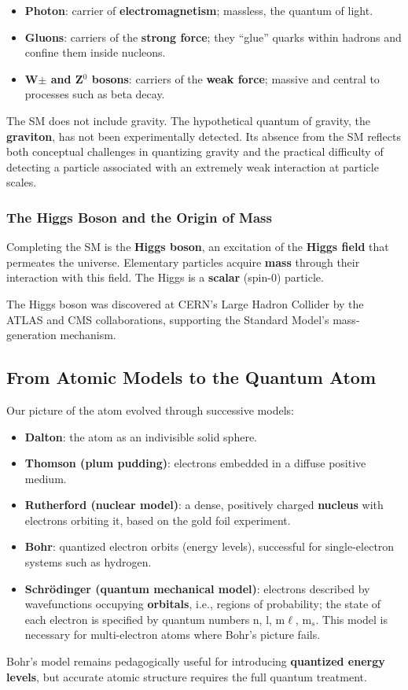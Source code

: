 \documentclass[11pt,a4paper]{article}
\let\originalsubsection\subsection
\renewcommand{\subsection}{\Needspace{8\baselineskip}\originalsubsection}
\begin{document}
\begin{itemize}
\item \textbf{Photon}: carrier of \textbf{electromagnetism}; massless, the quantum of light.
\item \textbf{Gluons}: carriers of the \textbf{strong force}; they ``glue'' quarks within hadrons and confine them inside nucleons.
\item \textbf{W\ensuremath{\pm} and Z\ensuremath{{}^{0}} bosons}: carriers of the \textbf{weak force}; massive and central to processes such as beta decay.
\end{itemize}
The SM does not include gravity. The hypothetical quantum of gravity, the \textbf{graviton}, has not been experimentally detected. Its absence from the SM reflects both conceptual challenges in quantizing gravity and the practical difficulty of detecting a particle associated with an extremely weak interaction at particle scales.

\subsubsection{The Higgs Boson and the Origin of Mass}
Completing the SM is the \textbf{Higgs boson}, an excitation of the \textbf{Higgs field} that permeates the universe. Elementary particles acquire \textbf{mass} through their interaction with this field. The Higgs is a \textbf{scalar} (spin-0) particle.

The Higgs boson was discovered at CERN's Large Hadron Collider by the ATLAS and CMS collaborations, supporting the Standard Model's mass-generation mechanism.

\subsection{From Atomic Models to the Quantum Atom}
Our picture of the atom evolved through successive models:

\begin{itemize}
\item \textbf{Dalton}: the atom as an indivisible solid sphere.
\item \textbf{Thomson (plum pudding)}: electrons embedded in a diffuse positive medium.
\item \textbf{Rutherford (nuclear model)}: a dense, positively charged \textbf{nucleus} with electrons orbiting it, based on the gold foil experiment.
\item \textbf{Bohr}: quantized electron orbits (energy levels), successful for single-electron systems such as hydrogen.
\item \textbf{Schrödinger (quantum mechanical model)}: electrons described by wavefunctions occupying \textbf{orbitals}, i.e., regions of probability; the state of each electron is specified by quantum numbers n, l, m\ensuremath{\ell}, m\ensuremath{{}_{s}}. This model is necessary for multi-electron atoms where Bohr's picture fails.
\end{itemize}
Bohr's model remains pedagogically useful for introducing \textbf{quantized energy levels}, but accurate atomic structure requires the full quantum treatment.
\end{document}
